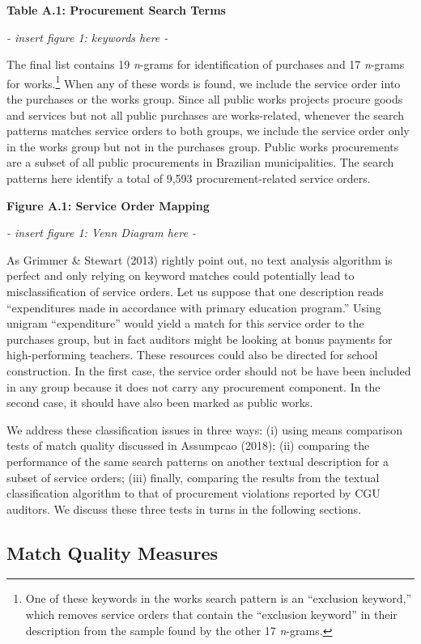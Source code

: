 \documentclass[]{article}
\let\rmarkdownfootnote\footnote%
\def\footnote{\protect\rmarkdownfootnote}
\theoremstyle{definition}
\theoremstyle{definition}
\theoremstyle{definition}
\theoremstyle{remark}
\begin{document}
\textbf{Table A.1: Procurement Search Terms}

\emph{- insert figure 1: keywords here -}

The final list contains 19 \emph{n}-grams for identification of
purchases and 17 \emph{n}-grams for works.\footnote{One of these
  keywords in the works search pattern is an ``exclusion keyword,''
  which removes service orders that contain the ``exclusion keyword'' in
  their description from the sample found by the other 17
  \emph{n}-grams.} When any of these words is found, we include the
service order into the purchases or the works group. Since all public
works projects procure goods and services but not all public purchases
are works-related, whenever the search patterns matches service orders
to both groups, we include the service order only in the works group but
not in the purchases group. Public works procurements are a subset of
all public procurements in Brazilian municipalities. The search patterns
here identify a total of 9,593 procurement-related service orders.

\textbf{Figure A.1: Service Order Mapping}

\emph{- insert figure 1: Venn Diagram here -}

As Grimmer \& Stewart (2013) rightly point out, no text analysis
algorithm is perfect and only relying on keyword matches could
potentially lead to misclassification of service orders. Let us suppose
that one description reads ``expenditures made in accordance with
primary education program.'' Using unigram ``expenditure'' would yield a
match for this service order to the purchases group, but in fact
auditors might be looking at bonus payments for high-performing
teachers. These resources could also be directed for school
construction. In the first case, the service order should not be have
been included in any group because it does not carry any procurement
component. In the second case, it should have also been marked as public
works.

We address these classification issues in three ways: (i) using means
comparison tests of match quality discussed in Assumpcao (2018); (ii)
comparing the performance of the same search patterns on another textual
description for a subset of service orders; (iii) finally, comparing the
results from the textual classification algorithm to that of procurement
violations reported by CGU auditors. We discuss these three tests in
turns in the following sections.

\hypertarget{quality1}{%
\subsection{Match Quality Measures}\label{quality1}}
\end{document}

